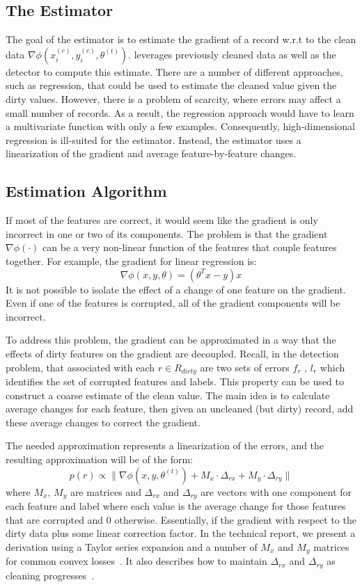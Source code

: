 \subsection{The Estimator}\label{sampling}
The goal of the estimator is to estimate the gradient of a record w.r.t to the clean data $\nabla\phi(x^{(c)}_i,y^{(c)}_i,\theta^{(t)})$.
\sys leverages previously cleaned data as well as the detector to compute this estimate.
There are a number of different approaches, such as regression, that could be used to estimate the cleaned value given the dirty values.
However, there is a problem of scarcity, where errors may affect a small number of records.
As a result, the regression approach would have to learn a multivariate function with only a few examples.
Consequently, high-dimensional regression is ill-suited for the estimator.
Instead, the estimator uses a linearization of the gradient and average feature-by-feature changes.

\subsection{Estimation Algorithm}
If most of the features are correct, it would seem like the gradient is only
incorrect in one or two of its components.
The problem is that the gradient $\nabla\phi(\cdot)$ can be a very non-linear function of the features that couple features together.
For example, the gradient for linear regression is:
\[
\nabla\phi(x,y,\theta) = (\theta^Tx - y)x
\]
It is not possible to isolate the effect of a change of one feature on the gradient.
Even if one of the features is corrupted, all of the gradient components will be incorrect.

To address this problem, the gradient can be approximated in a way that the effects of dirty features on the gradient are decoupled.
Recall, in the detection problem, that associated with each $r \in R_{dirty}$ are two sets of errors $f_r$ , $l_r$ which identifies the set of corrupted features and labels.
This property can be used to construct a coarse estimate of the clean value.
The main idea is to calculate average changes for each feature, then given an uncleaned (but dirty) record, add these average changes to correct the gradient.

The needed approximation represents a linearization of the errors, and the resulting approximation will be of the form:
\[
p(r)\propto\|\nabla\phi(x,y,\theta^{(t)}) + M_x \cdot \Delta_{rx} +  M_y \cdot \Delta_{ry}\|
\]
where $M_x$, $M_y$ are matrices and $\Delta_{rx}$ and $\Delta_{ry}$ are vectors with one component for each feature and label where each value is the average change for those features that are corrupted and 0 otherwise.
Essentially, if the gradient with respect to the dirty data plus some linear correction factor.
In the technical report, we present a derivation using a Taylor series expansion and a number of $M_x$ and $M_y$ matrices for common convex losses~\cite{activecleanarxiv}.
It also describes how to maintain $\Delta_{rx}$ and $\Delta_{ry}$ as cleaning progresses~\cite{activecleanarxiv}.

